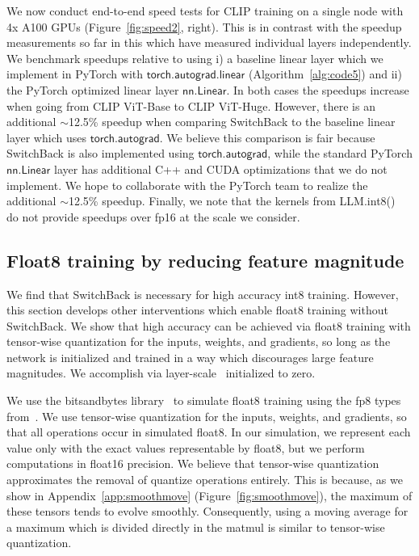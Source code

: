 We now conduct end-to-end speed tests for CLIP training on a single node with 4x A100 GPUs (Figure~\ref{fig:speed2}, right). This is in contrast with the speedup measurements so far in this which have measured individual layers independently. We benchmark speedups relative to using i) a baseline linear layer which we implement in PyTorch with $\mathsf{torch.autograd.linear}$ (Algorithm~\ref{alg:code5}) and ii) the PyTorch optimized linear layer $\mathsf{nn.Linear}$.
In both cases the speedups increase when going from CLIP ViT-Base to CLIP ViT-Huge. However, there is an additional $\sim$12.5\% speedup when comparing SwitchBack to the baseline linear layer which uses $\mathsf{torch.autograd}$.
We believe this comparison is fair because SwitchBack is also implemented using $\mathsf{torch.autograd}$, while the standard PyTorch $\mathsf{nn.Linear}$ layer has additional C++ and CUDA optimizations that we do not implement. We hope to collaborate with the PyTorch team to realize the additional $\sim$12.5\% speedup. Finally, we note that the kernels from LLM.int8()~\cite{dettmers2022llm} do not provide speedups over fp16 at the scale we consider.

\subsection{Float8 training by reducing feature magnitude}\label{sec:fp8}

We find that SwitchBack is necessary for high accuracy int8 training. However, this section develops other interventions which enable float8 training without SwitchBack. We show that high accuracy can be achieved via float8 training with tensor-wise quantization for the inputs, weights, and gradients, so long as the network is initialized and trained in a way which discourages large feature magnitudes. We accomplish via layer-scale~\cite{touvron2021going} initialized to zero.

We use the bitsandbytes library~\cite{dettmers2022optimizers} to simulate float8 training using the fp8 types from~\citet{micikevicius2022fp8}. 
We use tensor-wise quantization for the inputs, weights, and gradients, so that all operations occur in simulated float8. In our simulation, we represent each value only with the exact values representable by float8, but we perform computations in float16 precision. We believe that tensor-wise quantization approximates the removal of quantize operations entirely. This is because, as we show in Appendix~\ref{app:smoothmove} (Figure~\ref{fig:smoothmove}), the maximum of these tensors tends to evolve smoothly. Consequently, using a moving average for a maximum which is divided directly in the matmul is similar to tensor-wise quantization.


